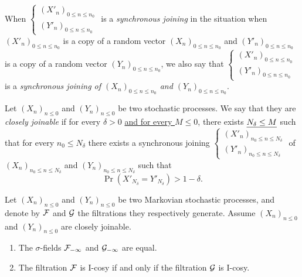 \documentclass[12pt,a4paper]{article}
\begin{document}
When $\left\{\begin{smallmatrix} {(X'_n)}_{0 \leq n \leq n_0} \\ 
{(Y'_n)}_{0 \leq n \leq n_0}
\end{smallmatrix}\right.$  is a \emph{synchronous joining} in the situation when 
${(X'_n)}_{0 \leq n \leq n_0}$ is a copy of a random vector 
${(X_n)}_{0 \leq n \leq n_0}$  and ${(Y'_n)}_{0 \leq n \leq n_0}$ 
is a copy of a random vector ${(Y_n)}_{0 \leq n \leq n_0}$, we also say that 
$\left\{\begin{smallmatrix} {(X'_n)}_{0 \leq n \leq n_0} \\ 
{(Y'_n)}_{0 \leq n \leq n_0}
\end{smallmatrix}\right.$  is a \emph{synchronous joining of 
${(X_n)}_{0 \leq n \leq n_0}$ and ${(Y_n)}_{0 \leq n \leq n_0}$}. 


\begin{definition}
Let ${(X_n)}_{n \leq 0}$ and ${(Y_n)}_{n \leq 0}$ be two stochastic processes. 
We say that they are \emph{closely joinable} if for every $\delta >0$ 
\uline{and for every $M\leq 0$}, there exists 
$\uline{N_\delta \leq M}$ such that for every $n_0 \leq N_\delta$ there exists a 
synchronous joining $\left\{\begin{smallmatrix} {(X'_n)}_{n_0 \leq n \leq N_\delta} \\ 
{(Y'_n)}_{n_0 \leq n \leq N_\delta}
\end{smallmatrix}\right.$ 
of ${(X_n)}_{n_0 \leq n \leq N_\delta}$ and ${(Y_n)}_{n_0 \leq n \leq N_\delta}$ 
such that 
$$
\Pr(X'_{N_\delta}=Y'_{N_\delta}) > 1-\delta. 
$$ 
\end{definition}

\begin{thm}\label{thm:joinable}
Let ${(X_n)}_{n \leq 0}$ and ${(Y_n)}_{n \leq 0}$ be two Markovian stochastic processes, and 
denote by $\mathcal{F}$ and $\mathcal{G}$ the filtrations they respectively generate. 
Assume ${(X_n)}_{n \leq 0}$ and ${(Y_n)}_{n \leq 0}$ are closely joinable. 
\begin{enumerate}
\item The $\sigma$-fields $\mathcal{F}_{-\infty}$  and $\mathcal{G}_{-\infty}$ are equal. 

\item The filtration $\mathcal{F}$ is I-cosy if and only if the filtration $\mathcal{G}$ is I-cosy.
\end{enumerate}
\end{thm}
\end{document}
